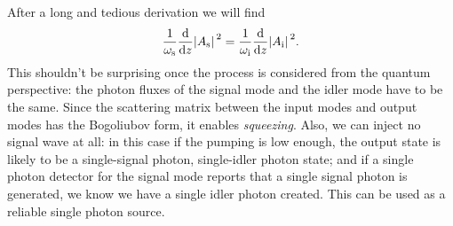 \documentclass[hyperref, a4paper]{article}
\begin{document}
After a long and tedious derivation we will find 
\begin{equation}
    \frac{1}{\omega_{\text{s}}} \dv{z} \abs*{A_\text{s}}^2 = 
    \frac{1}{\omega_{\text{i}}} \dv{z} \abs*{A_\text{i}}^2 . 
\end{equation}
This shouldn't be surprising once the process is considered from the quantum perspective:
the photon fluxes of the signal mode and the idler mode 
have to be the same.
Since the scattering matrix between the input modes and output modes 
has the Bogoliubov form, it enables \emph{squeezing}.
Also, we can inject no signal wave at all:
in this case if the pumping is low enough, 
the output state is likely to be a 
single-signal photon, single-idler photon state; 
and if a single photon detector for the signal mode reports 
that a single signal photon is generated, 
we know we have a single idler photon created.
This can be used as a reliable single photon source.
\end{document}
